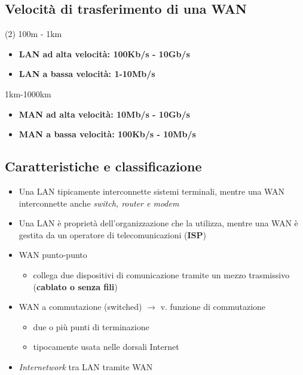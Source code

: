 \documentclass{book}
\begin{document}
\subsection{Velocità di trasferimento di una WAN}
\begin{tasks}(2)
  \task 100m - 1km
  \begin{itemize}
  \item {\bf LAN ad alta velocità: {\color{red} 100Kb/s - 10Gb/s}}
  \item {\bf LAN a bassa velocità: {\color{red} 1-10Mb/s}}
  \end{itemize}
  \task 1km-1000km 
  \begin{itemize}
  \item {\bf MAN ad alta velocità: {\color{red} 10Mb/s - 10Gb/s}}
    \item {\bf MAN a bassa velocità: {\color{red} 100Kb/s - 10Mb/s}}
  \end{itemize}
\end{tasks}
\subsection{Caratteristiche e classificazione}
\begin{itemize}
\item Una LAN tipicamente interconnette sistemi terminali, mentre una
  WAN interconnette anche {\it switch, router e modem}
\item Una LAN è proprietà dell’organizzazione che la utilizza, mentre una
  WAN è gestita da un operatore di telecomunicazioni ({\bf ISP})
\item WAN punto-punto
  \begin{itemize}
	\item collega due dispositivi di comunicazione tramite un mezzo
		trasmissivo ({\bf cablato o senza fili})
  \end{itemize}
\item WAN a commutazione (switched) $\to$ v. funzione di commutazione
  \begin{itemize}
  	\item due o più punti di terminazione
  	\item tipocamente usata nelle dorsali Internet
  \end{itemize}
\item {\it Internetwork} tra LAN tramite WAN  
\end{itemize}
\end{document}
